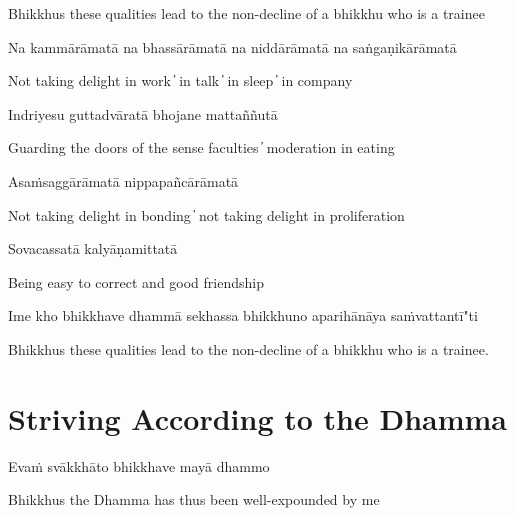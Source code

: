 \begin{cprenglish}
  Bhikkhus these qualities lead to the non-decline of a bhikkhu who is a trainee
\end{cprenglish}

Na kammārāmatā na bhassārāmatā na niddārāmatā na saṅgaṇikārāmatā

\begin{cprenglish}
  Not taking delight in work  ̓  in talk  ̓  in sleep  ̓  in company
\end{cprenglish}

Indriyesu guttadvāratā bhojane mattaññutā

\begin{cprenglish}
  Guarding the doors of the sense faculties  ̓  moderation in eating
\end{cprenglish}

Asaṁsaggārāmatā nippapañcārāmatā

\begin{cprenglish}
  Not taking delight in bonding  ̓  not taking delight in proliferation
\end{cprenglish}

Sovacassatā kalyāṇamittatā

\begin{cprenglish}
  Being easy to correct and good friendship
\end{cprenglish}

Ime kho bhikkhave dhammā sekhassa bhikkhuno aparihānāya saṁvattantī"ti

\begin{cprenglish}
  Bhikkhus these qualities lead to the non-decline of a bhikkhu who is a trainee.
\end{cprenglish}


\section{Striving According to the Dhamma}

\begin{leader}
\end{leader}

Evaṁ svākkhāto bhikkhave mayā dhammo

\begin{cprenglish}
  Bhikkhus the Dhamma has thus been well-expounded by me
\end{cprenglish}

